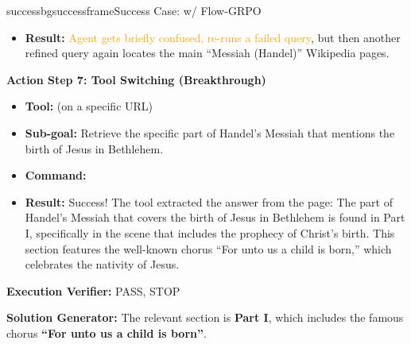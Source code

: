 \begin{small}
\begin{center}
\begin{casebox}{successbg}{successframe}{Success Case: \model w/ Flow-GRPO}
\begin{itemize}[nosep, leftmargin=*]
         
         and 
         
        \item \textbf{Result:} \textcolor{orange}{Agent gets briefly confused, re-runs a failed query}, but then another refined query again locates the main ``Messiah (Handel)'' Wikipedia pages.
    \end{itemize}

    \vspace{1em}

    \textbf{Action Step 7: Tool Switching (Breakthrough)}
    \begin{itemize}[nosep, leftmargin=*]
        \item \textbf{Tool:}  (on a specific URL)
        \item \textbf{Sub-goal:} Retrieve the specific part of Handel's Messiah that mentions the birth of Jesus in Bethlehem.
        \item \textbf{Command:}

        \item \textbf{Result:} {Success! The tool extracted the answer from the page: The part of Handel's Messiah that covers the birth of Jesus in Bethlehem is found in Part I, specifically in the scene that includes the prophecy of Christ's birth. This section features the well-known chorus ``For unto us a child is born,'' which celebrates the nativity of Jesus.}
    \end{itemize}

    \vspace{1em}

    \textbf{Execution Verifier:} \textcolor{successframe}{PASS, STOP}

    \vspace{1em}

    \textbf{Solution Generator: } \textcolor{successframe}{The relevant section is \textbf{Part I}, which includes the famous chorus \textbf{``For unto us a child is born''}.}

\end{casebox}


\end{center}
\end{small}
